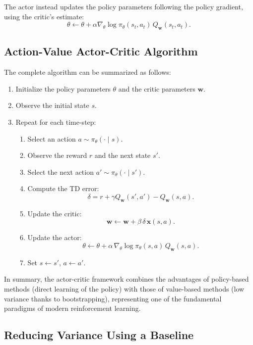 The actor instead updates the policy parameters following the policy gradient, using the critic's estimate:
\[
\theta
\leftarrow
\theta
+ \alpha \nabla_\theta \log \pi_\theta(s_t,a_t)\, Q_{\mathbf{w}}(s_t,a_t).
\]

\subsection{Action-Value Actor-Critic Algorithm}

The complete algorithm can be summarized as follows:

\begin{enumerate}
    \item Initialize the policy parameters $\theta$ and the critic parameters $\mathbf{w}$.
    \item Observe the initial state $s$.
    \item Repeat for each time-step:
    \begin{enumerate}
        \item Select an action $a \sim \pi_\theta(\cdot \mid s)$.
        \item Observe the reward $r$ and the next state $s'$.
        \item Select the next action $a' \sim \pi_\theta(\cdot \mid s')$.
        \item Compute the TD error:
        \[
        \delta = r + \gamma Q_{\mathbf{w}}(s',a') - Q_{\mathbf{w}}(s,a).
        \]
        \item Update the critic:
        \[
        \mathbf{w} \leftarrow \mathbf{w} + \beta\, \delta\, \mathbf{x}(s,a).
        \]
        \item Update the actor:
        \[
        \theta \leftarrow \theta + \alpha\, \nabla_\theta \log \pi_\theta(s,a)\, Q_{\mathbf{w}}(s,a).
        \]
        \item Set $s \leftarrow s'$, $a \leftarrow a'$.
    \end{enumerate}
\end{enumerate}

In summary, the actor-critic framework combines the advantages of policy-based methods (direct learning of the policy) with those of value-based methods (low variance thanks to bootstrapping), representing one of the fundamental paradigms of modern reinforcement learning.

\subsection{Reducing Variance Using a Baseline}

